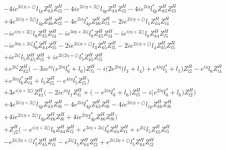 \begin{align}
 &-4 i e^{2 i \Big(\eta +\zeta \Big)} l_{1p} Z_{{k 3}}^{H} Z_{{l 3}}^{H} -4 i e^{2 i \Big(\eta +2 \zeta \Big)} l_{4p} Z_{{k 3}}^{H} Z_{{l 3}}^{H} -4 i e^{2 i \eta } l_{4p}^* Z_{{k 3}}^{H} Z_{{l 3}}^{H} \nonumber \\ 
 &+4 e^{2 i \Big(\eta +2 \zeta \Big)} l_{4p} Z_{{k 6}}^{H} Z_{{l 3}}^{H} -4 e^{2 i \eta } l_{4p}^* Z_{{k 6}}^{H} Z_{{l 3}}^{H} -2 i e^{2 i \Big(\eta +\zeta \Big)} l_1 Z_{{k 4}}^{H} Z_{{l 4}}^{H} \nonumber \\ 
 &-i e^{i \Big(\eta +2 \zeta \Big)} l_6 Z_{{k 5}}^{H} Z_{{l 4}}^{H} -i e^{3 i \eta +2 i \zeta } l_6^* Z_{{k 5}}^{H} Z_{{l 4}}^{H} -i e^{i \Big(\eta +2 \zeta \Big)} l_6 Z_{{k 4}}^{H} Z_{{l 5}}^{H} \nonumber \\ 
 &-i e^{3 i \eta +2 i \zeta } l_6^* Z_{{k 4}}^{H} Z_{{l 5}}^{H} -2 i e^{2 i \Big(\eta +\zeta \Big)} l_3 Z_{{k 5}}^{H} Z_{{l 5}}^{H} -2 i e^{2 i \Big(\eta +\zeta \Big)} l_4 Z_{{k 5}}^{H} Z_{{l 5}}^{H} \nonumber \\ 
 &+i e^{2 i \zeta } l_5 Z_{{k 5}}^{H} Z_{{l 5}}^{H} +i e^{2 i \Big(2 \eta +\zeta \Big)} l_5^* Z_{{k 5}}^{H} Z_{{l 5}}^{H} \nonumber \\ 
 &+e^{2 i \zeta } Z_{{k 2}}^{H} \Big(-3 i e^{i \eta } \Big(e^{2 i \eta } l_6^*  + l_6\Big)Z_{{l 1}}^{H} -i \Big(2 e^{2 i \eta } \Big(l_3 + l_4\Big) + e^{4 i \eta } l_5^*  + l_5\Big)Z_{{l 2}}^{H} - e^{i \eta } l_6 Z_{{l 4}}^{H} \nonumber \\ 
 &+e^{3 i \eta } l_6^* Z_{{l 4}}^{H} +l_5 Z_{{l 5}}^{H} - e^{4 i \eta } l_5^* Z_{{l 5}}^{H} \Big)\nonumber \\ 
 &+3 e^{i \Big(\eta +2 \zeta \Big)} Z_{{k 1}}^{H} \Big(-2 i e^{i \eta } l_1 Z_{{l 1}}^{H}  + \Big(- e^{2 i \eta } l_6^*  + l_6\Big)Z_{{l 5}}^{H}  -i \Big(e^{2 i \eta } l_6^*  + l_6\Big)Z_{{l 2}}^{H} \Big)\nonumber \\ 
 &+4 e^{2 i \Big(\eta +2 \zeta \Big)} l_{4p} Z_{{k 3}}^{H} Z_{{l 6}}^{H} -4 e^{2 i \eta } l_{4p}^* Z_{{k 3}}^{H} Z_{{l 6}}^{H} -4 i e^{2 i \Big(\eta +\zeta \Big)} l_{1p} Z_{{k 6}}^{H} Z_{{l 6}}^{H} \nonumber \\ 
 &+4 i e^{2 i \Big(\eta +2 \zeta \Big)} l_{4p} Z_{{k 6}}^{H} Z_{{l 6}}^{H} +4 i e^{2 i \eta } l_{4p}^* Z_{{k 6}}^{H} Z_{{l 6}}^{H} \Big)\nonumber \\ 
 &+Z_{{j 2}}^{H} \Big(- e^{i \Big(\eta +2 \zeta \Big)} l_6 Z_{{k 4}}^{H} Z_{{l 1}}^{H} +e^{3 i \eta +2 i \zeta } l_6^* Z_{{k 4}}^{H} Z_{{l 1}}^{H} +e^{2 i \zeta } l_5 Z_{{k 5}}^{H} Z_{{l 1}}^{H} \nonumber \\ 
 &- e^{2 i \Big(2 \eta +\zeta \Big)} l_5^* Z_{{k 5}}^{H} Z_{{l 1}}^{H} - e^{2 i \zeta } l_5 Z_{{k 4}}^{H} Z_{{l 2}}^{H} +e^{2 i \Big(2 \eta +\zeta \Big)} l_5^* Z_{{k 4}}^{H} Z_{{l 2}}^{H} \nonumber \\ 

\end{align}
